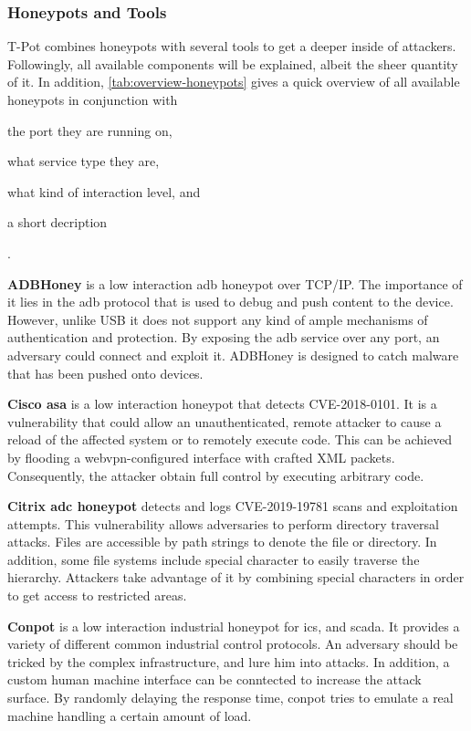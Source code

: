 \subsubsection{Honeypots and Tools}

T-Pot combines honeypots with several tools to get a deeper inside of attackers.
Followingly, all available components will be explained, albeit the sheer quantity of it. 
In addition, \autoref{tab:overview-honeypots} gives a quick overview of all available honeypots in conjunction with
\begin{enumerate*}[label=(\roman*)]
    \item the port they are running on,
    \item what service type they are,
    \item what kind of interaction level, and
    \item a short decription
\end{enumerate*}.

\textbf{ADBHoney} \cite{adbhoney2021} is a low interaction \ac{adb} honeypot over TCP/IP.
The importance of it lies in the \ac{adb} protocol that is used to debug and push content to the device.
However, unlike USB it does not support any kind of ample mechanisms of authentication and protection.
By exposing the \ac{adb} service over any port, an adversary could connect and exploit it.
ADBHoney is designed to catch malware that has been pushed onto devices.

\textbf{Cisco \ac{asa}} \cite{cymmetria2018} is a low interaction honeypot that detects CVE-2018-0101\cite{CVE-2018-0101}.
It is a vulnerability that could allow an unauthenticated, remote attacker to cause a reload of the affected system or to remotely execute code.
This can be achieved by flooding a webvpn-configured interface with crafted XML packets.
Consequently, the attacker obtain full control by executing arbitrary code.

\textbf{Citrix \ac{adc} honeypot} \cite{citrixhoneypot2020} detects and logs CVE-2019-19781\cite{CVE-2019-19781} scans and exploitation attempts.
This vulnerability allows adversaries to perform directory traversal attacks.
Files are accessible by path strings to denote the file or directory.
In addition, some file systems include special character to easily traverse the hierarchy.
Attackers take advantage of it by combining special characters in order to get access to restricted areas. \cite{flanders2019}

\textbf{Conpot} \cite{conpot2021} is a low interaction industrial honeypot for \ac{ics}, and \ac{scada}.
It provides a variety of different common industrial control protocols.
An adversary should be tricked by the complex infrastructure, and lure him into attacks.
In addition, a custom human machine interface can be conntected to increase the attack surface.
By randomly delaying the response time, conpot tries to emulate a real machine handling a certain amount of load.

